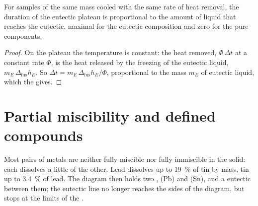 \begin{proposition}\label{prop:b2:solid-liquid-diagrams:plateau-length}
For samples of the same mass cooled with the same rate of heat removal, the
duration of the eutectic plateau is proportional to the amount of liquid that
reaches the eutectic, maximal for the eutectic composition and zero for the
pure components.
\end{proposition}

\begin{proof}
On the plateau the temperature is constant: the heat removed, $\Phi\,\Delta t$
at a constant rate $\Phi$, is the heat released by the freezing of the
eutectic liquid, $m_E\,\Delta_{\text{fus}}h_E$. So $\Delta t = m_E\,\Delta_{\text{fus}}h_E/
\Phi$, proportional to the mass $m_E$ of eutectic liquid, which the  gives.
\end{proof}

\section{Partial miscibility and defined compounds}

Most pairs of metals are neither fully miscible nor fully immiscible in the
solid: each dissolves a little of the other. Lead dissolves up to 19~\% of tin
by mass, tin up to 3.4~\% of lead. The diagram then holds two , (Pb) and (Sn), and a eutectic between them; the eutectic line no
longer reaches the sides of the diagram, but stops at the limits of the .

